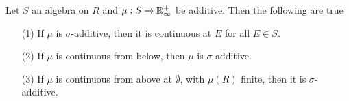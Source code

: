 \begin{lemma}\label{lemma_7}
    Let $S$ an algebra on  $R$ and  $\mu:S \xrightarrow{} \mathbb{R}^+_\infty$ be
    additive. Then the following are true
    \begin{enumerate}
        \item[(1)] If $\mu$ is $\sigma$-additive, then it is continuous at $E$
            for all  $E \in S$.

        \item[(2)] If $\mu$ is continuous from below, then  $\mu$ is
            $\sigma$-additive.

        \item[(3)] If $\mu$ is continuous from above at  $\emptyset$, with
            $\mu(R)$ finite, then it is $\sigma$-additive.
    \end{enumerate}
\end{lemma}
